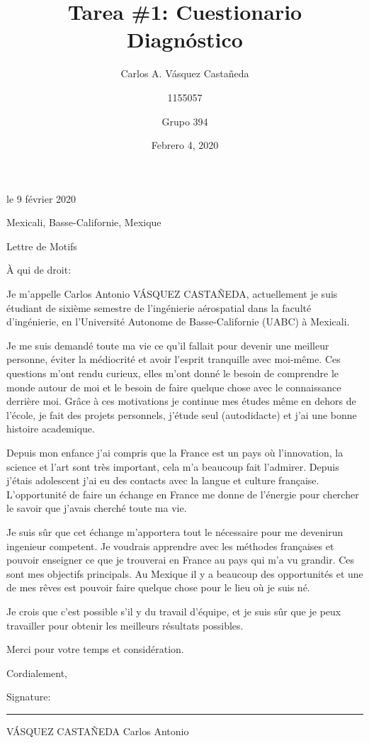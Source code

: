 \documentclass[12pt, letterpaper]{article}
\title{Tarea \#1: Cuestionario Diagnóstico}
\author{Carlos A. Vásquez Castañeda \and 1155057 \and Grupo 394}
\date{Febrero 4, 2020}
\begin{document}
\hspace*{\fill} le 9 février 2020

\hspace*{\fill} Mexicali, Basse-Californie, Mexique

\begin{center}
	Lettre de Motifs
\end{center}

À qui de droit:

Je m'appelle Carlos Antonio VÁSQUEZ CASTAÑEDA, actuellement je suis étudiant de sixième semestre de l'ingénierie aérospatial dans la faculté d'ingénierie, en l'Université Autonome de Basse-Californie (UABC) à Mexicali.

Je me suis demandé toute ma vie ce qu'il fallait pour devenir une meilleur personne, éviter la médiocrité et avoir l'esprit tranquille avec moi-même. Ces questions m'ont rendu curieux, elles m'ont donné le besoin de comprendre le monde autour de moi et le besoin de faire quelque chose avec le connaissance derrière moi. Grâce à ces motivations je continue mes études même en dehors de l'école, je fait des projets personnels, j'étude seul (autodidacte) et j'ai une bonne histoire academique.

Depuis mon enfance j'ai compris que la France est un pays où l'innovation, la science et l'art sont très important, cela m'a beaucoup fait l'admirer. Depuis j'étais adolescent j'ai eu des contacts avec la langue et culture française. L'opportunité de faire un échange en France me donne de l'énergie pour chercher le savoir que j'avais cherché toute ma vie.

Je suis sûr que cet échange m'apportera tout le nécessaire pour me devenirun ingenieur competent. Je voudrais apprendre avec les méthodes françaises et pouvoir enseigner ce que je trouverai en France au pays qui m'a vu grandir. Ces sont mes objectifs principals. Au Mexique il y a beaucoup des opportunités et une de mes rêves est pouvoir faire quelque chose pour le lieu où je suis né.

Je crois que c'est possible s'il y du travail d'équipe, et je suis sûr que je peux travailler pour obtenir les meilleurs résultats possibles.

Merci pour votre temps et considération.

\hspace*{\fill} Cordialement,

\hspace*{\fill} Signature: \noindent\rule{6cm}{0.4pt}

\hspace*{\fill} VÁSQUEZ CASTAÑEDA Carlos Antonio
\renewcommand\refname{References}
\printbibliography
\end{document}
